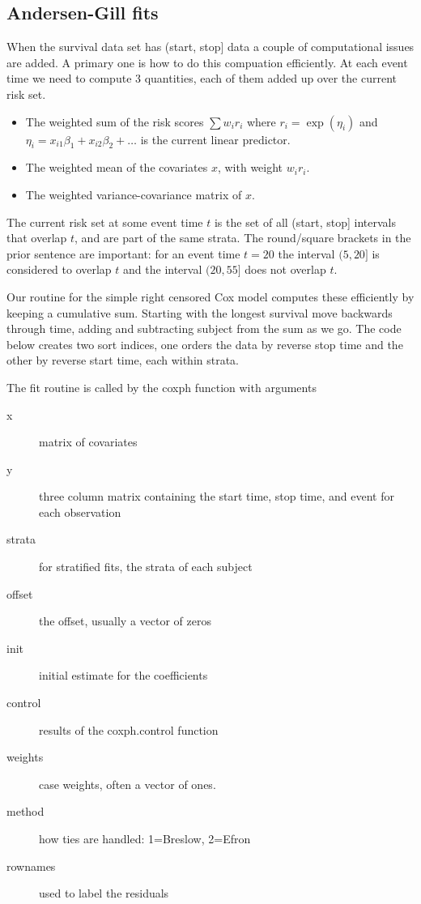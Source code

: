 \documentclass{article}
\begin{document}
\subsection{Andersen-Gill fits}
When the survival data set has (start, stop] data a couple of computational
issues are added.  
A primary one is how to do this compuation efficiently.
At each event time we need to compute 3 quantities, each of them added up 
over the current risk set.
\begin{itemize}
  \item The weighted sum of the risk scores $\sum w_i r_i$ where
    $r_i = \exp(\eta_i)$ and $\eta_i = x_{i1}\beta_1 + x_{i2}\beta_2 +\ldots$
    is the current linear predictor.
  \item The weighted mean of the covariates $x$, with weight $w_i r_i$.
  \item The weighted variance-covariance matrix of $x$.
\end{itemize}
The current risk set at some event time $t$ is the set of all (start, stop]
intervals that overlap $t$, and are part of the same strata. 
The round/square brackets in the prior sentence are important: for an event time
$t=20$ the interval $(5,20]$ is considered to overlap $t$ and the interval
$(20,55]$ does not overlap $t$.
    
Our routine for the simple right censored Cox model computes these efficiently
by keeping a cumulative sum.  Starting with the longest survival move
backwards through time, adding and subtracting subject from the sum as
we go.
The code below creates two sort indices, one orders the data by reverse stop
time and the other by reverse start time, each within strata.
 
The fit routine is called by the coxph function with arguments
\begin{description}
  \item[x] matrix of covariates
  \item[y] three column matrix containing the start time, stop time, and event
   for each observation
  \item[strata] for stratified fits, the strata of each subject
  \item[offset] the offset, usually a vector of zeros
  \item[init] initial estimate for the coefficients
  \item[control] results of the coxph.control function
  \item[weights] case weights, often a vector of ones.
  \item[method] how ties are handled: 1=Breslow, 2=Efron
  \item[rownames] used to label the residuals
\end{description}
\end{document}
